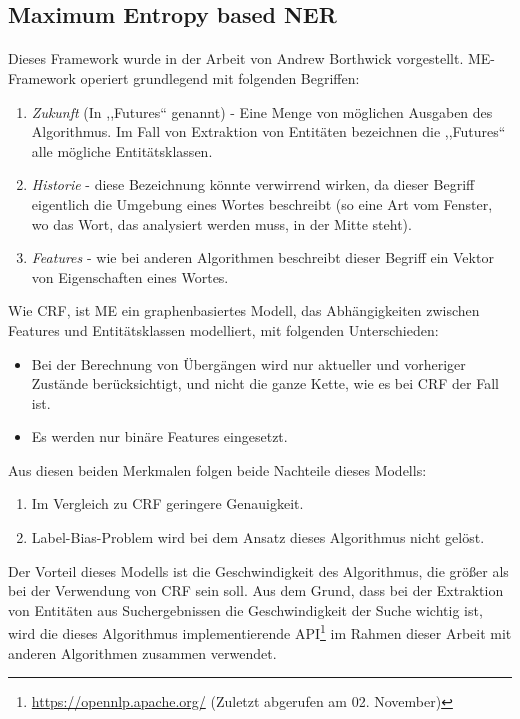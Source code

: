 \subsection{Maximum Entropy based NER} \label{sec:MEGRUND}
\paragraph{}
Dieses Framework wurde in der Arbeit von Andrew Borthwick\cite{borthwick1999maximum} vorgestellt. ME-Framework operiert grundlegend mit folgenden Begriffen:
\begin{enumerate}
\item \textit{Zukunft} (In \cite{borthwick1999maximum} ,,Futures`` genannt) - Eine Menge von möglichen Ausgaben des Algorithmus. Im Fall von Extraktion von Entitäten bezeichnen die ,,Futures`` alle mögliche Entitätsklassen.
\item \textit{Historie} - diese Bezeichnung könnte verwirrend wirken, da dieser Begriff eigentlich die Umgebung eines Wortes beschreibt (so eine Art vom Fenster, wo das Wort, das analysiert werden muss, in der Mitte steht).
\item \textit{Features} - wie bei anderen Algorithmen beschreibt dieser Begriff ein Vektor von Eigenschaften eines Wortes.
\end{enumerate}

Wie CRF, ist ME ein graphenbasiertes Modell, das Abhängigkeiten zwischen Features und Entitätsklassen modelliert, mit folgenden Unterschieden:
\begin{itemize}
\item Bei der Berechnung von Übergängen wird nur aktueller und vorheriger Zustände berücksichtigt, und nicht die ganze Kette, wie es bei CRF der Fall ist\cite{lafferty2001conditional}\cite{rossler2007korpus}.
\item Es werden nur binäre Features\cite{ratnaparkhi1998maximum}\cite{borthwick1999maximum} eingesetzt.
\end{itemize}

Aus diesen beiden Merkmalen folgen beide Nachteile dieses Modells:
\begin{enumerate}
\item Im Vergleich zu CRF\cite{rossler2007korpus} geringere Genauigkeit.
\item Label-Bias-Problem wird bei dem Ansatz dieses Algorithmus nicht gelöst\cite{lafferty2001conditional}.
\end{enumerate}
Der Vorteil dieses Modells ist die Geschwindigkeit des Algorithmus, die größer als bei der Verwendung von CRF sein soll\cite{Jenny/etal:07}. Aus dem Grund, dass bei der Extraktion von Entitäten aus Suchergebnissen die Geschwindigkeit der Suche wichtig ist, wird die dieses Algorithmus implementierende API\footnote{\url{https://opennlp.apache.org/} (Zuletzt abgerufen am 02. November)} im Rahmen dieser Arbeit mit anderen Algorithmen zusammen verwendet.

